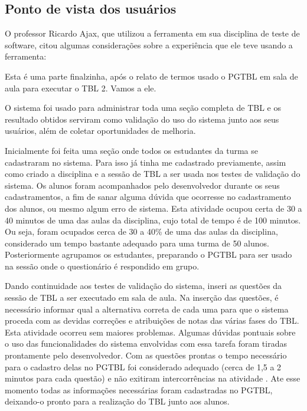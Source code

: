 \subsection{Ponto de vista dos usuários}

O professor Ricardo Ajax, que utilizou a ferramenta em sua disciplina de teste de software, citou algumas
considerações sobre a experiência que ele teve usando a ferramenta:

\begin{quoting}[rightmargin=0cm, leftmargin=4cm]
  \fontsize{10}{12}\selectfont
  \noindent
  Esta é uma parte finalzinha, após o relato de termos usado o PGTBL em sala de aula para executar o TBL 2. Vamos a ele.

  \noindent
  O sistema foi usado para administrar toda uma seção completa de TBL e os resultado obtidos serviram como validação
  do uso do sistema junto aos seus usuários, além de coletar oportunidades de melhoria.

  \noindent
  Inicialmente foi feita uma seção onde todos os estudantes da turma se cadastraram no sistema. Para isso já tinha me
  cadastrado previamente, assim como criado a disciplina e a sessão de TBL a ser
  usada nos testes de validação do sistema. Os alunos foram acompanhados pelo desenvolvedor durante os seus
  cadastramentos, a fim de sanar alguma dúvida que ocorresse no cadastramento dos alunos, ou mesmo algum erro de
  sistema. Esta atividade ocupou certa de 30 a 40 minutos de uma das aulas da disciplina, cujo total de tempo é de 100
  minutos. Ou seja, foram ocupados cerca de 30 a 40\% de uma das aulas da disciplina, considerado um tempo bastante
  adequado para uma turma de 50 alunos. Posteriormente agrupamos os estudantes, preparando
  o PGTBL para ser usado na sessão onde o questionário é respondido em grupo.

  \noindent
  Dando continuidade aos testes de validação do sistema, inseri as questões da sessão de TBL a ser
  executado em sala de aula. Na inserção das questões, é necessário informar qual a alternativa correta de cada uma para
  que o sistema proceda com as devidas correções e atribuições de notas das várias fases do TBL. Esta atividade ocorreu
  sem maiores problemas. Algumas dúvidas pontuais sobre o uso das funcionalidades do sistema envolvidas com essa tarefa
  foram tiradas prontamente pelo desenvolvedor.  Com as questões prontas o tempo necessário para o cadastro delas no
  PGTBL foi considerado adequado (cerca de 1,5 a 2 minutos para cada questão) e não exitiram intercorrências na
  atividade . Ate esse momento todas as informações necessárias foram cadastradas no PGTBL, deixando-o pronto para a
  realização do TBL junto aos alunos.


\end{quoting}
